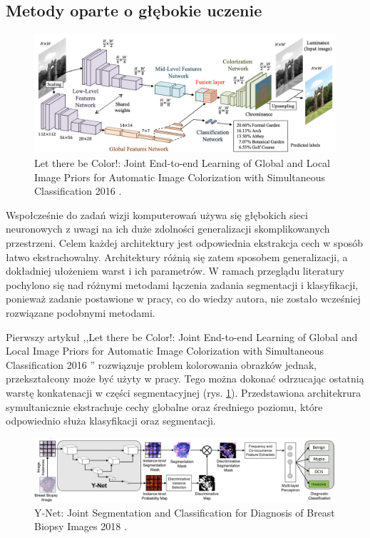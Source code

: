 \subsection{Metody oparte o głębokie uczenie}

\begin{figure}
    \includegraphics[width=\textwidth]{images/global-local-features.png}
    \caption{Let there be Color!: Joint End-to-end Learning of Global and Local Image Priors for Automatic Image Colorization with Simultaneous Classification 2016 \cite{iizuka2016let}.}
    \label{fig:parrarel-arch}
\end{figure}

Wspołcześnie do zadań wizji komputerowań używa się głębokich sieci neuronowych z uwagi na ich duże zdolności generalizacji skomplikowanych przestrzeni. Celem każdej architektury jest odpowiednia ekstrakcja cech w sposób łatwo ekstrachowalny. Architektury różnią się zatem sposobem generalizacji, a dokładniej ułożeniem warst i ich parametrów. W ramach przeglądu literatury pochylono się nad różnymi metodami łączenia zadania segmentacji i klasyfikacji, ponieważ zadanie postawione w pracy, co do wiedzy autora, nie zostało wcześniej rozwiązane podobnymi metodami.

Pierwszy artykuł ,,Let there be Color!: Joint End-to-end Learning of Global and Local Image Priors for Automatic Image Colorization with Simultaneous Classification 2016 \cite{iizuka2016let}'' rozwiązuje problem kolorowania obrazków jednak, przekształcony może być użyty w pracy. Tego można dokonać odrzucając ostatnią warstę konkatenacji w części segmentacyjnej (rys. \ref{fig:parrarel-arch}). Przedstawiona architekrura symultanicznie ekstrachuje cechy globalne oraz średniego poziomu, które odpowiednio służa klasyfikacji oraz segmentacji.

\begin{figure}
    \includegraphics[width=\textwidth]{images/y-net.png}
    \caption{Y-Net: Joint Segmentation and Classification for Diagnosis of Breast Biopsy Images 2018 \cite{mehta2018net}.}
    \label{fig:y-net}
\end{figure}


